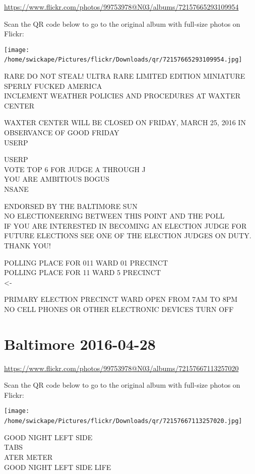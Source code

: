 \documentclass[10pt,letterpaper]{article}
\begin{document}
\url{https://www.flickr.com/photos/99753978@N03/albums/72157665293109954}

Scan the QR code below to go to the original album with full-size photos on Flickr:

\texttt{[image: /home/swickape/Pictures/flickr/Downloads/qr/72157665293109954.jpg]}
\

RARE DO NOT STEAL!  ULTRA RARE LIMITED EDITION MINIATURE\\
SPERLY FUCKED AMERICA\\
INCLEMENT WEATHER POLICIES AND PROCEDURES AT WAXTER CENTER

WAXTER CENTER WILL BE CLOSED ON FRIDAY, MARCH 25, 2016 IN OBSERVANCE OF GOOD FRIDAY\\
USERP

USERP\\
VOTE TOP 6 FOR JUDGE A THROUGH J\\
YOU ARE AMBITIOUS BOGUS\\
NSANE

ENDORSED BY THE BALTIMORE SUN\\
NO ELECTIONEERING BETWEEN THIS POINT AND THE POLL\\
IF YOU ARE INTERESTED IN BECOMING AN ELECTION JUDGE FOR FUTURE ELECTIONS SEE ONE OF THE ELECTION JUDGES ON DUTY.  THANK YOU!

POLLING PLACE FOR 011 WARD 01 PRECINCT\\
POLLING PLACE FOR 11 WARD 5 PRECINCT\\
<{-}

PRIMARY ELECTION PRECINCT WARD OPEN FROM 7AM TO 8PM\\
NO CELL PHONES OR OTHER ELECTRONIC DEVICES TURN OFF
\

\section*{Baltimore 2016-04-28}

\url{https://www.flickr.com/photos/99753978@N03/albums/72157667113257020}

Scan the QR code below to go to the original album with full-size photos on Flickr:

\texttt{[image: /home/swickape/Pictures/flickr/Downloads/qr/72157667113257020.jpg]}
\

GOOD NIGHT LEFT SIDE\\
TABS\\
ATER METER\\
GOOD NIGHT LEFT SIDE LIFE
\end{document}
